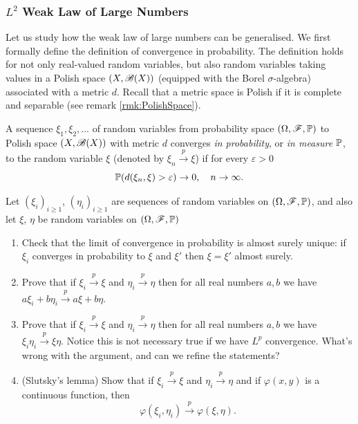 \subsubsection{$L^2$ Weak Law of Large Numbers}
Let us study how the weak law of large numbers can be generalised. We first formally define the definition of convergence in probability. The definition holds for not only real-valued random variables, but also random variables taking values in a Polish space $(X,\mathcal{B}(X))$ (equipped with the Borel $\sigma$-algebra) associated with a metric $d$. Recall that a metric space is Polish if it is complete and separable (see remark \ref{rmk:PolishSpace}). 
\begin{definition}
A sequence $\xi_1, \xi_2, \dots $ of random variables from probability space $(\Omega,\mathcal{F},\mathbb{P})$ to Polish space $(X,\mathcal{B}(X))$ with metric $d$ converges \textit{in probability}, or \textit{in measure $\mathbb{P}$}, to the random variable $\xi$ (denoted by $\xi_n \xrightarrow{p} \xi$) if for every $\varepsilon > 0$
\begin{equation*}
    \mathbb{P}(d(\xi_n, \xi) > \varepsilon) \rightarrow 0, \quad n\rightarrow \infty.
\end{equation*}
\end{definition}

\begin{exercise}
Let $(\xi_i)_{i\geq 1}$, $(\eta_i)_{i \geq 1}$ are sequences of random variables on $(\Omega,\mathcal{F},\mathbb{P})$, and also let $\xi$, $\eta$ be random variables on $(\Omega,\mathcal{F},\mathbb{P})$
\begin{enumerate}
    \item Check that the limit of convergence in probability is almost surely unique: if $\xi_i$ converges in probability to $\xi$ and $\xi'$ then $\xi = \xi'$ almost surely.
    \item Prove that if $\xi_i \overset{p}{\to} \xi$ and $\eta_i \overset{p}{\to} \eta$ then for all real numbers $a,b$ we have $a\xi_i + b\eta_i \overset{p}{\to} a\xi + b\eta$.
    \item Prove that if $\xi_i \overset{p}{\to} \xi$ and $\eta_i \overset{p}{\to} \eta$ then for all real numbers $a,b$ we have $\xi_i \eta_i \overset{p}{\to} \xi \eta$. Notice this is not necessary true if we have $L^p$ convergence. What's wrong with the argument, and can we refine the statements?
    \item (Slutsky's lemma) Show that if $\xi_i \xrightarrow{p} \xi$ and $\eta_i \xrightarrow{p} \eta$ and if $\varphi(x,y)$ is a continuous function, then 
    \begin{equation*}
        \varphi(\xi_i, \eta_i) \xrightarrow{p} \varphi(\xi, \eta).
    \end{equation*}
\end{enumerate}
\end{exercise}

